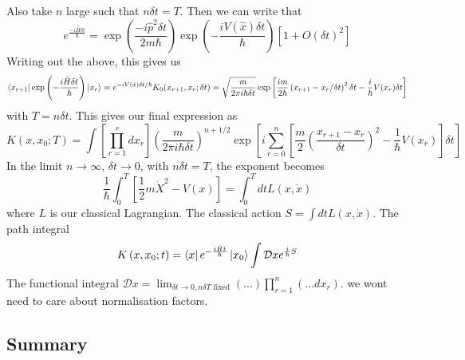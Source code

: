 \documentclass[11pt, oneside]{article}   	%
\theoremstyle{slanted}
\newcommand{\planck}{\hbar}
\begin{document}
Also take $ n $ large such that $ n \delta t  = T $. 
Then we can write that 
 \[
	 e ^{ \frac{ - i \hat{ H } \delta t }{ \planck } }  = \exp\left( \frac{ 
	 - i \hat{ p } ^ 2 \delta t }{ 2 m \planck }  \right)  \exp\left( 
 - \frac{ i V ( \hat{ x } ) \delta t }{ \planck }\right) \left[  
 1 + O ( \delta t ) ^ 2  \right]  
\] 
Writing out the above, this gives us 
\[
	\bra{ x _{ r + 1 } } \exp\left(   - \frac{ i \hat{ H } \delta t  }{ \planck } \right)
	\ket{ x _ r }  = e ^{  - i V ( \hat{ x } ) \delta t  / \planck } K _ 0 ( 
	x _{ r + 1 }, x _ r ; \delta t )  =
	\sqrt{ \frac{m}{2 \pi i \planck  \delta t }} \exp
	\left[  \frac{ i m }{ 2 \planck} \left( x_{ r + 1 }  - x _ r  / \delta t  \right)^ 2 \delta t 
	- \frac{ i  }{\planck} V ( x _r ) \delta t \right] 
\] with $ T = n \delta t $. 
This gives our final expression as 
\[
 K \left( x, x_0 ; T  \right)   = 
 \int \left[  \prod_{r = 1 }^ r d x _r  \right]  
 \left( \frac{m}{ 2 \pi i \planck \delta t }  \right)  ^{ n +1  / 2 } 
 \exp \left[  i \sum_{ r = 0 } ^ n \left[  
 \frac{m}{ 2} \left( \frac{x_{ r + 1 }  - x _ r }{ \delta t }  \right) ^ 2  - \frac{1}{ \planck}
 V ( x _ r ) \right]   \delta t  \right] 
\] In the limit $ n \to \infty $, $ \delta t \to 0 $, 
with $ n \delta t  = T $, the exponent becomes 
 \[
 \frac{1}{ \planck} \int _ 0 ^ T \left[  
 \frac{1}{2 } m \dot{  X  } ^ 2  - V ( x )  \right] = 
 \int_ 0 ^ T dt L \left( x , \dot{ x }   \right) 
\] where $ L $ is our classical Lagrangian. 
The classical action $S  = \int dt L ( x , \dot{ x   } )  $. 
The path integral 
\[
 K \left( x, x_0 ; t  \right)   = \bra{x }e ^{  - \frac{ i \hat{ H } t }{ \planck}} \ket{ x_0 } 
 \int \mathcal{ D } x e ^{  \frac{i}{\planck} S }
\] The functional integral $ \mathcal{ D } x  = \lim_{ \delta t \to 0 , n \delta T 
\text{ fixed}} \left( ... \right) \prod_{ r = 1 }^{ n } \left( ... dx_r  \right) $. 
we wont need to care about normalisation factors. 

\subsection*{Summary}
\end{document}
